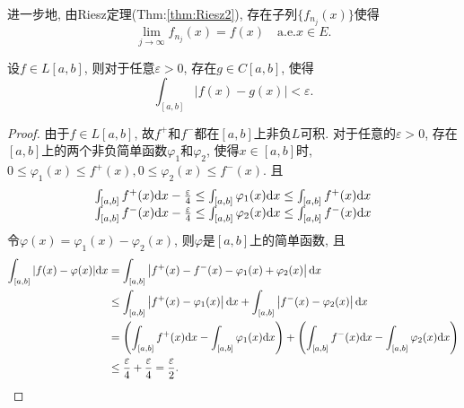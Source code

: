 进一步地, 由Riesz定理(Thm:\ref{thm:Riesz2}), 存在子列$\{ f_{n_j}(x) \}$使得
$$
	\lim\limits_{j \to \infty} f_{n_j}(x) = f(x) \quad \text{a.e.} x \in E.
$$

\begin{proposition}
	设$f \in L[a,b]$, 则对于任意$\varepsilon >0$, 存在$g \in C[a,b]$, 使得
	$$
		\int_{[a,b]} |f(x) - g(x)| < \varepsilon.
	$$
\end{proposition}
\begin{proof}  
 \par 
由于$f \in L[a, b]$, 故$f^+$和$f^-$都在$[a, b]$上非负$L$可积.
对于任意的$\varepsilon>0$, 存在$[a, b]$上的两个非负简单函数$\varphi_{1}$和$\varphi_{2}$, 
使得$x \in[a, b]$时, $0 \leq \varphi_1 (x) \leq f^+(x), 0 \leq \varphi_2 (x) \leq f^-(x)$. 且
$$
\begin{array}{l}
\int_{[a, b]} f^+(x) \mathrm{d} x-\frac{\varepsilon}{4} \leq \int_{[a, b]} \varphi_1 (x) \mathrm{d} x \leq \int_{[a, b]} f^+(x) \mathrm{d} x \\
\int_{[a, b]} f^-(x) \mathrm{d} x-\frac{\varepsilon}{4} \leq \int_{[a, b]} \varphi_2 (x) \mathrm{d} x \leq \int_{[a, b]} f^-(x) \mathrm{d} x
\end{array}
$$
令$\varphi(x)=\varphi_1 (x)-\varphi_2 (x)$, 
则$\varphi$是$[a, b]$上的简单函数, 且
$$
\begin{aligned}
\int_{[a, b]}|f(x)-\varphi(x)| \mathrm{d} x &=\int_{[a, b]}\left|f^+(x)-f^-(x)-\varphi_1 (x)+\varphi_2 (x)\right| \mathrm{d} x \\
& \leq \int_{[a, b]}\left|f^+(x)-\varphi_1 (x)\right| \mathrm{d} x+\int_{[a, b]}\left|f^-(x)-\varphi_2 (x)\right| \mathrm{d} x \\
&=\left(\int_{[a, b]} f^+(x) \mathrm{d} x-\int_{[a, b]} \varphi_1 (x) \mathrm{d} x\right)+\left(\int_{[a, b]} f^-(x) \mathrm{d} x-\int_{[a, b]} \varphi_2 (x) \mathrm{d} x\right) \\
& \leq \frac{\varepsilon}{4}+\frac{\varepsilon}{4}=\frac{\varepsilon}{2}.
\end{aligned}
$$ 


\end{proof}
